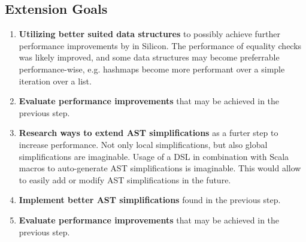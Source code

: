 \documentclass[11pt]{article}
\begin{document}
    \subsection{Extension Goals}
    \begin{enumerate}
        \item \textbf{Utilizing better suited data structures} to possibly achieve
        further performance improvements by in Silicon. The performance of
        equality checks was likely improved, and some data
        structures may become preferrable performance-wise, e.g. hashmaps become
        more performant over a simple iteration over a list.
        \item \textbf{Evaluate performance improvements} that may be
        achieved in the previous step.
        \item \textbf{Research ways to extend AST simplifications} as a furter step
        to increase performance. Not only local simplifications, but also global
        simplifications are imaginable. Usage of a DSL in combination with Scala macros to
        auto-generate AST simplifications is imaginable. This would allow to easily add or modify
        AST simplifications in the future.
        \item \textbf{Implement better AST simplifications} found in the previous step.
        \item \textbf{Evaluate performance improvements} that may be
        achieved in the previous step.

    \end{enumerate}

    \printbibliography
    
\end{document}
